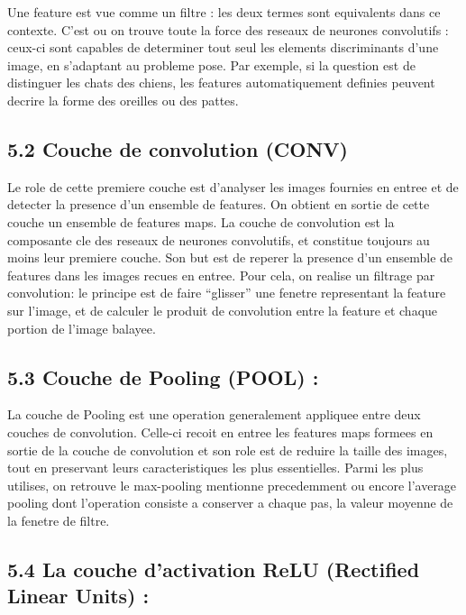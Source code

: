 \documentclass[]{article}
\begin{document}
Une feature est vue comme un filtre : les deux termes sont equivalents
dans ce contexte. C'est ou on trouve toute la force des reseaux de
neurones convolutifs : ceux-ci sont capables de determiner tout seul les
elements discriminants d'une image, en s'adaptant au probleme pose. Par
exemple, si la question est de distinguer les chats des chiens, les
features automatiquement definies peuvent decrire la forme des oreilles
ou des pattes.

\subsection{5.2 Couche de convolution
(CONV)}\label{couche-de-convolution-conv}

Le role de cette premiere couche est d'analyser les images fournies en
entree et de detecter la presence d'un ensemble de features. On obtient
en sortie de cette couche un ensemble de features maps. La couche de
convolution est la composante cle des reseaux de neurones convolutifs,
et constitue toujours au moins leur premiere couche. Son but est de
reperer la presence d'un ensemble de features dans les images recues en
entree. Pour cela, on realise un filtrage par convolution: le principe
est de faire ``glisser'' une fenetre representant la feature sur
l'image, et de calculer le produit de convolution entre la feature et
chaque portion de l'image balayee.

\subsection{5.3 Couche de Pooling (POOL)
:}\label{couche-de-pooling-pool}

La couche de Pooling est une operation generalement appliquee entre deux
couches de convolution. Celle-ci recoit en entree les features maps
formees en sortie de la couche de convolution et son role est de reduire
la taille des images, tout en preservant leurs caracteristiques les plus
essentielles. Parmi les plus utilises, on retrouve le max-pooling
mentionne precedemment ou encore l'average pooling dont l'operation
consiste a conserver a chaque pas, la valeur moyenne de la fenetre de
filtre.

\subsection{5.4 La couche d'activation ReLU (Rectified Linear Units)
:}\label{la-couche-dactivation-relu-rectified-linear-units}
\end{document}
